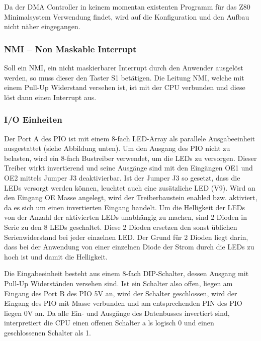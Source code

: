 Da der DMA Controller in keinem momentan existenten Programm für das Z80 Minimalsystem Verwendung findet, wird auf die Konfiguration und den Aufbau nicht näher eingegangen.

\subsubsection{NMI -- Non Maskable Interrupt}
Soll ein NMI, ein nicht maskierbarer Interrupt durch den Anwender ausgelöst werden, so muss dieser den Taster S1 betätigen. Die Leitung NMI, welche mit einem Pull-Up Widerstand versehen ist, ist mit der CPU verbunden und diese löst dann einen Interrupt aus.

\subsubsection{I/O Einheiten}
Der Port A des PIO ist mit einem 8-fach LED-Array als parallele Ausgabeeinheit ausgestattet (siehe Abbildung unten). Um den Ausgang des PIO nicht zu belasten, wird ein 8-fach Bustreiber verwendet, um die LEDs zu versorgen. Dieser Treiber wirkt invertierend und seine Ausgänge sind mit den Eingängen OE1 und OE2 mittels Jumper J3 deaktivierbar. Ist der Jumper J3 so gesetzt, dass die LEDs versorgt werden können, leuchtet auch eine zusätzliche LED (V9). Wird an den Eingang OE Masse angelegt, wird der Treiberbaustein enabled bzw. aktiviert, da es sich um einen invertierten Eingang handelt. Um die Helligkeit der LEDs von der Anzahl der aktivierten LEDs unabhängig zu machen, sind 2 Dioden in Serie zu den 8 LEDs geschaltet. Diese 2 Dioden ersetzen den sonst üblichen Serienwiderstand bei jeder einzelnen LED. Der Grund für 2 Dioden liegt darin, dass bei der Anwendung von einer einzelnen Diode der Strom durch die LEDs zu hoch ist und damit die Helligkeit.

Die Eingabeeinheit besteht aus einem 8-fach DIP-Schalter, dessen Ausgang mit Pull-Up Widerständen versehen sind. Ist ein Schalter also offen, liegen am Eingang des Port B des PIO 5V an, wird der Schalter geschlossen, wird der Eingang des PIO mit Masse verbunden und am entsprechenden PIN des PIO liegen 0V an. Da alle Ein- und Ausgänge des Datenbusses invertiert sind, interpretiert die CPU einen offenen Schalter a ls logisch 0 und einen geschlossenen Schalter als 1.

